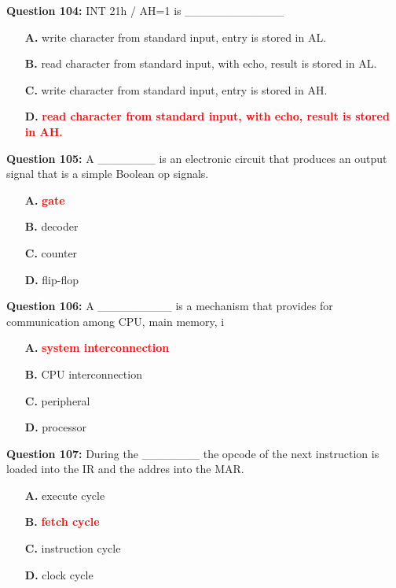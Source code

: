 \documentclass[12pt,a4paper]{article}
\begin{document}
\textbf{Question 104:} INT 21h / AH=1 is ____________

\begin{itemize}
    \item[\textbf{A.}] write character from standard input, entry is stored in AL.
    \item[\textbf{B.}] read character from standard input, with echo, result is stored in AL.
    \item[\textbf{C.}] write character from standard input, entry is stored in AH.
    \item[\textbf{D.}] \textcolor{red}{\textbf{read character from standard input, with echo, result is stored in AH.}}
\end{itemize}

\vspace{0.5cm}

\textbf{Question 105:} A _______ is an electronic circuit that produces an output signal that is a simple Boolean op signals.

\begin{itemize}
    \item[\textbf{A.}] \textcolor{red}{\textbf{gate}}
    \item[\textbf{B.}] decoder
    \item[\textbf{C.}] counter
    \item[\textbf{D.}] flip-flop
\end{itemize}

\vspace{0.5cm}

\textbf{Question 106:} A _________ is a mechanism that provides for communication among CPU, main memory, i

\begin{itemize}
    \item[\textbf{A.}] \textcolor{red}{\textbf{system interconnection}}
    \item[\textbf{B.}] CPU interconnection
    \item[\textbf{C.}] peripheral
    \item[\textbf{D.}] processor
\end{itemize}

\vspace{0.5cm}

\textbf{Question 107:} During the _______ the opcode of the next instruction is loaded into the IR and the addres into the MAR.

\begin{itemize}
    \item[\textbf{A.}] execute cycle
    \item[\textbf{B.}] \textcolor{red}{\textbf{fetch cycle}}
    \item[\textbf{C.}] instruction cycle
    \item[\textbf{D.}] clock cycle
\end{itemize}
\end{document}
